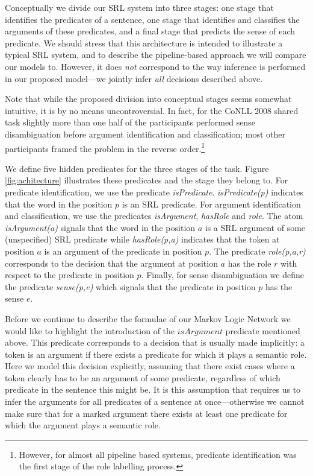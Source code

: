 

Conceptually we divide our SRL system into three stages: one stage that identifies the predicates of a sentence, one stage that identifies and classifies the arguments of these predicates, and a final stage that predicts the sense of each predicate. We should stress that this architecture is intended to illustrate a typical SRL system, and to describe the pipeline-based approach we will compare our models to. However, it does \emph{not} correspond to the way inference is performed in our proposed model---we jointly infer \emph{all} decisions described above.  

Note that while the proposed division into conceptual stages seems somewhat intuitive, it is by no means uncontroversial. In fact, for the CoNLL 2008 shared task slightly more than one half of the participants performed sense disambiguation before argument identification and classification; most other participants framed the problem in the reverse order.\footnote{However, for almost all pipeline based systems, predicate identification was the first stage of the role labelling process.} 

We define five hidden predicates for the three stages of the task. Figure \ref{fig:achitecture} illustrates these predicates and the stage they belong to. 
For predicate identification, we use the predicate \emph{isPredicate}. \emph{isPredicate(p)} indicates that the word in the position $p$ is an SRL predicate.
For argument identification and classification, we use the predicates \emph{isArgument}, \emph{hasRole} and \emph{role}. The atom \emph{isArgument(a)} signals that the word in the position $a$ is a SRL argument of some (unspecified) SRL predicate while \emph{hasRole(p,a)} indicates that the token at position $a$ is an argument of the predicate in position $p$. The predicate \emph{role(p,a,r)} corresponds to the decision that the argument at position $a$ has the role $r$ with respect to the predicate in position $p$. Finally, for sense disambiguation we  define the predicate \emph{sense(p,e)} which signals that the predicate in position $p$ has the sense $e$. 

Before we continue to describe the formulae of our Markov Logic Network we would like to highlight the introduction of the $isArgument$ predicate mentioned above. This predicate corresponds to a decision that is usually made implicitly: a token is an argument if there exists a predicate for which it plays a semantic role. Here we model this decision explicitly, assuming that there exist cases where a token clearly has to be an argument of some predicate, regardless of which predicate in the sentence this might be. It is this assumption that requires us to infer the arguments for all predicates of a sentence at once---otherwise we cannot make sure that for a marked argument there exists at least one predicate for which the argument plays a semantic role.

